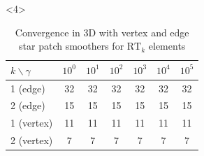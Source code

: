 \documentclass[presentation,aspectratio=43, 10pt]{beamer}
\newcommand{\convexpath}[2]{
  [
  create hullcoords/.code={
    \global\edef\namelist{#1}
    \foreach [count=\counter] \nodename in \namelist {
      \global\edef\numberofnodes{\counter}
      \coordinate (hullcoord\counter) at (\nodename);
    }
    \coordinate (hullcoord0) at (hullcoord\numberofnodes);
    \pgfmathtruncatemacro\lastnumber{\numberofnodes+1}
    \coordinate (hullcoord\lastnumber) at (hullcoord1);
  },
  create hullcoords
  ]
  ($(hullcoord1)!#2!-90:(hullcoord0)$)
  \foreach [
  evaluate=\currentnode as \previousnode using \currentnode-1,
  evaluate=\currentnode as \nextnode using \currentnode+1
  ] \currentnode in {1,...,\numberofnodes} {
    let \p1 = ($(hullcoord\currentnode) - (hullcoord\previousnode)$),
    \n1 = {atan2(\y1,\x1) + 90},
    \p2 = ($(hullcoord\nextnode) - (hullcoord\currentnode)$),
    \n2 = {atan2(\y2,\x2) + 90},
    \n{delta} = {Mod(\n2-\n1,360) - 360}
    in
    {arc [start angle=\n1, delta angle=\n{delta}, radius=#2]}
    -- ($(hullcoord\nextnode)!#2!-90:(hullcoord\currentnode)$)
  }
}
\begin{document}
\begin{frame}[fragile, t]
\begin{onlyenv}
\begin{columns}[T]
\begin{column}{0.4\textwidth}
\begin{center}
        \end{center}
      \end{column}
    \end{columns}
  \end{onlyenv}
  \begin{onlyenv}<4>
    \begin{table}
      \centering
      {\footnotesize
      \begin{tabular}{l|cccccc}
        $k\backslash \gamma$ & $10^0$ & $10^1$ & $10^2$ & $10^3$ & $10^4$ & $10^5$ \\
        \toprule
        1 (edge)             & 32     & 32     & 32     & 32     & 32     & 32     \\
        2 (edge)             & 15     & 15     & 15     & 15     & 15     & 15     \\
        \midrule
        1 (vertex)           & 11     & 11     & 11     & 11     & 11     & 11     \\
        2 (vertex)           & 7      & 7      & 7      & 7      & 7      & 7
      \end{tabular}
      \caption{Convergence in 3D with vertex and edge star patch
        smoothers for $\text{RT}_k$ elements}
      }
    \end{table}
  \end{onlyenv}
\end{frame}
\end{document}
